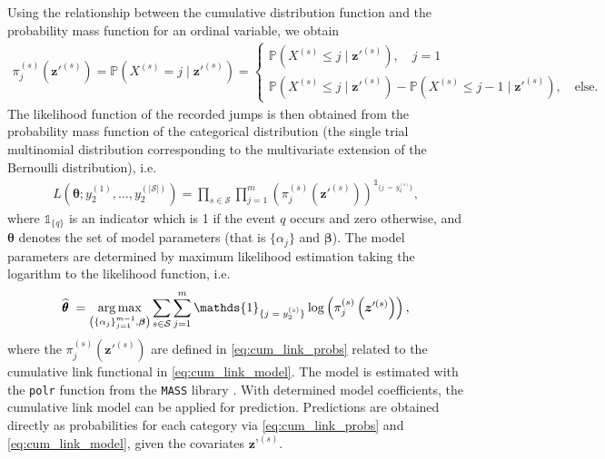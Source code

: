 Using the relationship between the cumulative distribution function and the probability mass function for an ordinal variable, we obtain
\begin{align}
     \pi^{(s)}_j\left(\bm{z}'^{(s)}\right) = 
     \mathds{P}\left( X^{(s)} = j \; \vert \; \bm{z}'^{(s)} \right) = 
    \begin{cases}
    \mathds{P}\left( X^{(s)} \leq j \; \vert \; \bm{z}'^{(s)} \right), \quad j = 1 \\
     \mathds{P}\left( X^{(s)} \leq j \; \vert \; \bm{z}'^{(s)} \right) - \mathds{P}\left( X^{(s)} \leq j -1 \; \vert \; \bm{z}'^{(s)} \right), \quad \text{else}.   
    \end{cases} \label{eq:cum_link_probs}
\end{align}
The likelihood function of the recorded jumps is then obtained from the probability mass function of the categorical distribution (the single trial multinomial distribution corresponding to the multivariate extension of the Bernoulli distribution), i.e.
\begin{equation*}
\begin{aligned}
     L\left( \bm{\theta}; y_2^{(1)}, \dots, y_2^{(|\mathcal{S}|)} \right) = \prod_{s \in \mathcal{S}} \prod_{j = 1}^m \left( \pi^{(s)}_j\left(\bm{z}'^{(s)}\right) \right)^{\mathds{1}_{ \{ j \; = \; y_2^{(s)}  \} }}, 
\end{aligned} \label{eq:likelihood_cumlink}
\end{equation*}
where $\mathds{1}_{ \{ q \} }$ is an indicator which is 1 if the event $q$ occurs and zero otherwise, and $\bm{\theta}$ denotes the set of model parameters (that is $\{\alpha_j\}$ and $\bm{\beta}$). The model parameters are determined by maximum likelihood estimation taking the logarithm to the likelihood function, i.e.
\begin{align*}
   \widehat{\pmb{\theta}}  \; = \argmax_{\left( \{ \alpha_{j} \}_{j = 1}^{m-1}, \bm{\beta} \right)} \sum_{s \in \mathcal{S}} \sum_{j = 1}^m 
   \mathds{1}_{ \{ j \; = \; y_2^{(s)} \} } \log\left( \pi^{(s)}_j\left(\bm{z}'^{(s)}\right) \right), 
\end{align*}
where the $\pi^{(s)}_j\left(\bm{z}'^{(s)}\right)$ are defined in \cref{eq:cum_link_probs} related to the cumulative link functional in \cref{eq:cum_link_model}.
The model is estimated with the \texttt{polr} function from the \texttt{MASS} library \citep{mass_R}.
With determined model coefficients, the cumulative link model can be applied for prediction. 
Predictions are obtained directly as probabilities for each category via \cref{eq:cum_link_probs} and \cref{eq:cum_link_model}, given the covariates $\bm{z}’^{(s)}$.


